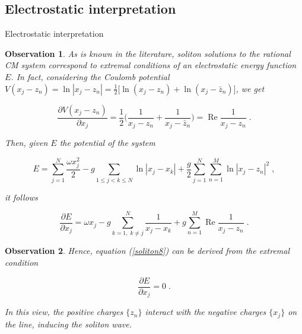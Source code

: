 \documentclass[aspectratio=169, 9pt]{beamer}
\newtheorem{obs}{Observation}
\begin{document}
\subsection{Electrostatic interpretation}
\begin{frame}[allowframebreaks]{Electrostatic interpretation}
\begin{obs}
As is known in the literature, soliton solutions to the rational CM system correspond to extremal conditions of an electrostatic energy function $E$. In fact, considering the Coulomb potential $V(x_j - z_n) = \ln{|x_j - z_n|} = \frac{1}{2}\big[\ln{(x_j - z_n)} + \ln{(x_j - \bar z_n)}\big]$, we get

\begin{equation}
    \frac{\partial V(x_j - z_n)}{\partial x_j} = \frac{1}{2} \Big ( \frac{1}{x_j - z_n} + \frac{1}{x_j - \bar z_n} \Big ) = \operatorname{Re}{\frac{1}{x_j - z_n}}\;.
\end{equation}

Then, given $E$ the potential of the system

\begin{equation}
    E = \sum_{j=1}^N \frac{\omega x_j^2}{2} - g \sum_{1 \leq j < k \leq N} \ln{|x_j - x_k|} + \frac{g}{2} \sum_{j = 1}^N \sum_{n=1}^M \ln{|x_j - z_n|^2}\;,
\end{equation}

it follows

\begin{equation}
    \frac{\partial E}{\partial x_j} = \omega x_j - g \sum_{k=1,\;k \neq j}^N \frac{1}{x_j - x_k} + g\sum_{n=1}^M \operatorname{Re}{\frac{1}{x_j - z_n}}\;.
\end{equation}
\end{obs}

\begin{obs}
Hence, equation (\ref{soliton8}) can be derived from the extremal condition 

\begin{equation}
    \frac{\partial E}{\partial x_j} = 0\;.
\end{equation}

In this view, the positive charges $\{z_n\}$ interact with the negative charges $\{x_j\}$ on the line, inducing the soliton wave. 
\end{obs}
\end{frame}
\end{document}
